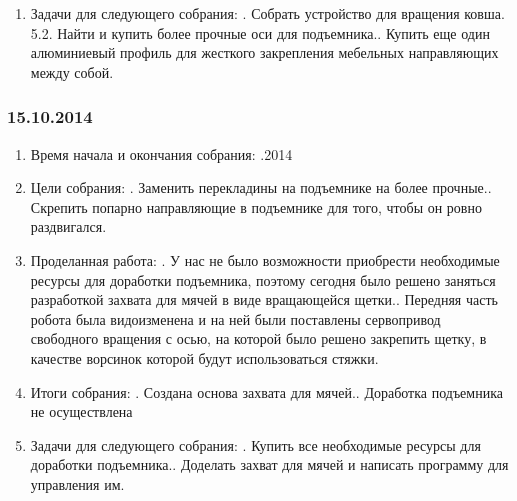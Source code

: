 \documentclass[11pt]{article}
\begin{document}
\begin{enumerate}
            \item Задачи для следующего собрания:
            .   Собрать устройство для вращения ковша.
            5.2.   Найти и купить более прочные оси для подъемника..   Купить еще один алюминиевый профиль для жесткого закрепления мебельных направляющих между собой.
            
         \end{enumerate}
         \newpage
         \subsubsection{15.10.2014}
         \begin{enumerate}
            \item Время начала и окончания собрания:
            .2014
            \item Цели собрания:
            .   Заменить перекладины на подъемнике на более прочные..   Скрепить попарно направляющие в подъемнике для того, чтобы он ровно раздвигался.
            
            \item Проделанная работа:
            .   У нас не было возможности приобрести необходимые ресурсы для доработки подъемника, поэтому сегодня было решено заняться разработкой захвата для мячей в виде вращающейся щетки..   Передняя часть робота была видоизменена и на ней были поставлены сервопривод свободного вращения с осью, на которой было решено закрепить щетку, в качестве ворсинок которой будут использоваться стяжки.
            
            \item Итоги собрания:
            .   Создана основа захвата для мячей..   Доработка подъемника не осуществлена
            
            \item Задачи для следующего собрания:
            .   Купить все необходимые ресурсы для доработки подъемника..   Доделать захват для мячей и написать программу для управления им.
            
         \end{enumerate}
         \newpage
\end{document}

